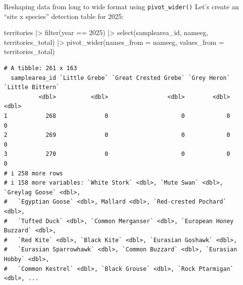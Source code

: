 \documentclass[
  ignorenonframetext,
  aspectratio=169,
]{beamer}
\newenvironment{Shaded}{\begin{snugshade}}{\end{snugshade}}
\newcommand{\AttributeTok}[1]{\textcolor[rgb]{0.40,0.45,0.13}{#1}}
\newcommand{\DecValTok}[1]{\textcolor[rgb]{0.68,0.00,0.00}{#1}}
\newcommand{\FunctionTok}[1]{\textcolor[rgb]{0.28,0.35,0.67}{#1}}
\newcommand{\NormalTok}[1]{\textcolor[rgb]{0.00,0.23,0.31}{#1}}
\newcommand{\SpecialCharTok}[1]{\textcolor[rgb]{0.37,0.37,0.37}{#1}}
\let\oldtexttt\texttt
\renewcommand{\texttt}[1]{\colorbox{gray!20}{\oldtexttt{#1}}}
\begin{document}
\begin{frame}[fragile]{Reshaping data from long to wide format using
\texttt{pivot\_wider()}}
\protect{}\label{reshaping-data-from-long-to-wide-format-using-pivot_wider}
Let's create an ``site x species'' detection table for 2025:

\scriptsize

\begin{Shaded}
\begin{Highlighting}[]
\NormalTok{territories }\SpecialCharTok{|\textgreater{}} 
    \FunctionTok{filter}\NormalTok{(year }\SpecialCharTok{==} \DecValTok{2025}\NormalTok{) }\SpecialCharTok{|\textgreater{}} 
    \FunctionTok{select}\NormalTok{(samplearea\_id, nameeg, territories\_total) }\SpecialCharTok{|\textgreater{}} 
    \FunctionTok{pivot\_wider}\NormalTok{(}\AttributeTok{names\_from =}\NormalTok{ nameeg, }
                \AttributeTok{values\_from =}\NormalTok{ territories\_total)}
\end{Highlighting}
\end{Shaded}

\begin{verbatim}
# A tibble: 261 x 163
  samplearea_id `Little Grebe` `Great Crested Grebe` `Grey Heron` `Little Bittern`
          <dbl>          <dbl>                 <dbl>        <dbl>            <dbl>
1           268              0                     0            0                0
2           269              0                     0            0                0
3           270              0                     0            0                0
# i 258 more rows
# i 158 more variables: `White Stork` <dbl>, `Mute Swan` <dbl>, `Greylag Goose` <dbl>,
#   `Egyptian Goose` <dbl>, Mallard <dbl>, `Red-crested Pochard` <dbl>,
#   `Tufted Duck` <dbl>, `Common Merganser` <dbl>, `European Honey Buzzard` <dbl>,
#   `Red Kite` <dbl>, `Black Kite` <dbl>, `Eurasian Goshawk` <dbl>,
#   `Eurasian Sparrowhawk` <dbl>, `Common Buzzard` <dbl>, `Eurasian Hobby` <dbl>,
#   `Common Kestrel` <dbl>, `Black Grouse` <dbl>, `Rock Ptarmigan` <dbl>, ...
\end{verbatim}

\normalsize
\end{frame}
\end{document}
